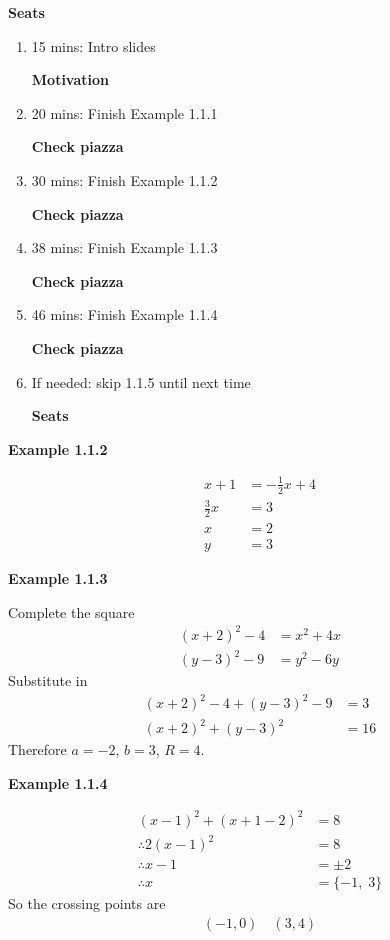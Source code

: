 \textbf{Seats}
\begin{enumerate}
    \item 15 mins: Intro slides \par
    \textbf{Motivation}
    \item 20 mins: Finish Example 1.1.1 \par
    \textbf{Check piazza}
    \item 30 mins: Finish Example 1.1.2 \par
    \textbf{Check piazza}
    \item 38 mins: Finish Example 1.1.3 \par
    \textbf{Check piazza}
    \item 46 mins: Finish Example 1.1.4 \par
    \textbf{Check piazza}
    \item If needed: skip 1.1.5 until next time \par
    \textbf{Seats}
\end{enumerate}

\vspace{10mm}
\textbf{Example 1.1.2}

\begin{align*}
x+1 &= -\frac{1}{2}x+4\\
\frac{3}{2}x &= 3\\
x &= 2\\
y &= 3
\end{align*}

\vspace{10mm}
\textbf{Example 1.1.3} \par
Complete the square
\begin{align*}
(x+2)^2 - 4 &= x^2 + 4x\\
(y-3)^2 - 9 &= y^2 - 6y
\end{align*}
Substitute in
\begin{align*}
(x+2)^2 - 4 + (y-3)^2 - 9 &= 3\\
(x+2)^2 + (y-3)^2 &= 16
\end{align*}
Therefore $a=-2$, $b=3$, $R=4$.

\vspace{10mm}
\textbf{Example 1.1.4}\par
\begin{align*}
    (x-1)^2 + (x+1-2)^2 &= 8\\
    \therefore 2(x-1)^2 &= 8\\
    \therefore x-1 &= \pm 2\\
    \therefore x &= \{-1,\; 3\}
\end{align*}
So the crossing points are
\begin{align*}
(-1,0) \quad (3,4)
\end{align*}

